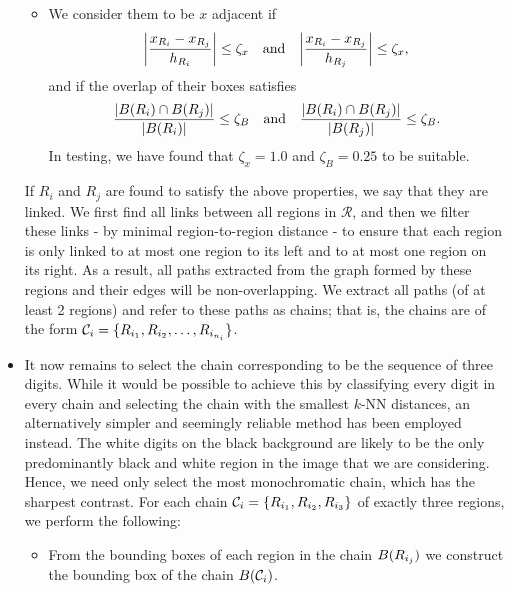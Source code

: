 \documentclass{article}
\begin{document}
\begin{itemize}
\begin{itemize}
  \item
    We consider them to be $x$ adjacent if
    \begin{equation*}
      \lrabs[\bigg]
      {
        \frac
        {
          x_{R_{i}}
          -
          x_{R_{j}}
        }
        {
          h_{R_{i}}
        }
      }
      \leq
      \zeta_{x}
      \qq{and}
      \lrabs[\bigg]
      {
        \frac
        {
          x_{R_{i}}
          -
          x_{R_{j}}
        }
        {
          h_{R_{j}}
        }
      }
      \leq
      \zeta_{x}
      ,
    \end{equation*}
    and if the overlap of their boxes satisfies
    \begin{equation*}
      \frac
      {
        \lrabs
        {
          B\lr{R_{i}}
          \cap
          B\lr{R_{j}}
        }
      }
      {
        \lrabs
        {
          B\lr{R_{i}}
        }
      }
      \leq
      \zeta_{B}
      \qq{and}
      \frac
      {
        \lrabs
        {
          B\lr{R_{i}}
          \cap
          B\lr{R_{j}}
        }
      }
      {
        \lrabs
        {
          B\lr{R_{j}}
        }
      }
      \leq
      \zeta_{B}
      .
    \end{equation*}
    In testing, we have found that $\zeta_{x} = 1.0$ and $\zeta_{B} = 0.25$ to
    be suitable.
  \end{itemize}
  If $R_{i}$ and $R_{j}$ are found to satisfy the above properties, we say that
  they are linked.
  We first find all links between all regions in $\mathcal{R}$, and then we
  filter these links - by minimal region-to-region distance - to ensure that
  each region is only linked to at most one region to its left and to at most
  one region on its right.
  As a result, all paths extracted from the graph formed by these regions and
  their edges will be non-overlapping.
  We extract all paths (of at least 2 regions) and refer to these paths as
  chains; that is, the chains are of the form
  $\mathcal{C}_{i} = \lbrace R_{i_{1}}, R_{i_{2}}, \dotsc, R_{i_{n_{i}}}\rbrace$.

\item
  It now remains to select the chain corresponding to be the sequence of three
  digits.
  While it would be possible to achieve this by classifying every digit in every
  chain and selecting the chain with the smallest $k$-NN distances, an
  alternatively simpler and seemingly reliable method has been employed instead.
  The white digits on the black background are likely to be the only
  predominantly black and white region in the image that we are considering.
  Hence, we need only select the most monochromatic chain, which has the
  sharpest contrast.
  For each chain $\mathcal{C}_{i} = \lbrace R_{i_{1}}, R_{i_{2}}, R_{i_{3}}\rbrace$ of
  exactly three regions, we perform the following:
  \begin{itemize}
  \item
    From the bounding boxes of each region in the chain $B(R_{i_{j}})$ we
    construct the bounding box of the chain $B(\mathcal{C}_{i})$.


\end{itemize}
\end{itemize}
\end{document}

